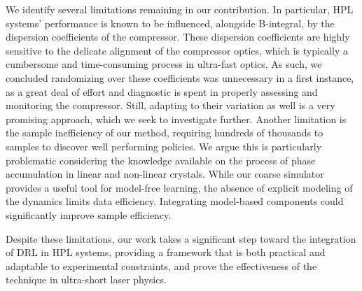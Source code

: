 
We identify several limitations remaining in our contribution. In particular, HPL systems' performance is known to be influenced, alongside B-integral, by the dispersion coefficients of the compressor. These dispersion coefficients are highly sensitive to the delicate alignment of the compressor optics, which is typically a cumbersome and time-consuming process in ultra-fast optics. As such, we concluded randomizing over these coefficients was unnecessary in a first instance, as a great deal of effort and diagnostic is spent in properly assessing and monitoring the compressor. Still, adapting to their variation as well is a very promising approach, which we seek to investigate further. \newline 
Another limitation is the sample inefficiency of our method, requiring hundreds of thousands to samples to discover well performing policies. We argue this is particularly problematic considering the knowledge available on the process of phase accumulation in linear and non-linear crystals. While our coarse simulator provides a useful tool for model-free learning, the absence of explicit modeling of the dynamics limits data efficiency. Integrating model-based components could significantly improve sample efficiency.

Despite these limitations, our work takes a significant step toward the integration of DRL in HPL systems, providing a framework that is both practical and adaptable to experimental constraints, and prove the effectiveness of the technique in ultra-short laser physics.